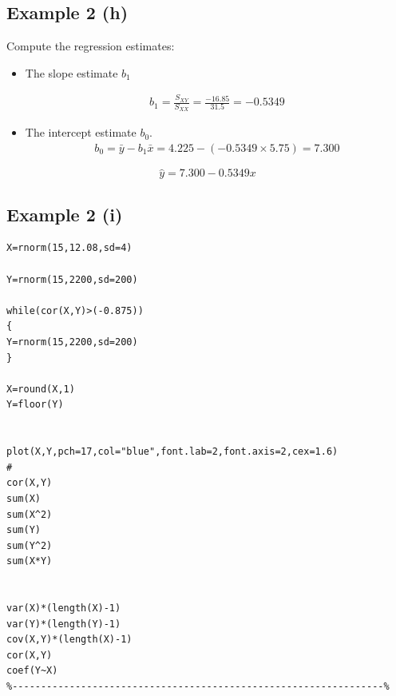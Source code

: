 \documentclass[]{report}
\begin{document}
\subsection{Example 2 (h)}
Compute the regression estimates:
\begin{itemize}
	\item  The slope estimate $b_1$
	
	\begin{eqnarray*}
		b_1 = \frac{S_{XY}}{S_{XX}} = \frac{-16.85}{31.5} = -0.5349
	\end{eqnarray*}
	
	\item  The intercept estimate $b_0$.
	\begin{eqnarray*}
		b_0 = \bar{y} -b_1\bar{x} = 4.225 - (-0.5349 \times 5.75) = 7.300
	\end{eqnarray*}
\end{itemize}

\[ \hat{y}  = 7.300 -0.5349 x \]




\subsection{Example 2 (i)}

%
%


\begin{verbatim}
X=rnorm(15,12.08,sd=4)

Y=rnorm(15,2200,sd=200)

while(cor(X,Y)>(-0.875))
{
Y=rnorm(15,2200,sd=200)
}

X=round(X,1)
Y=floor(Y)


plot(X,Y,pch=17,col="blue",font.lab=2,font.axis=2,cex=1.6)
#
cor(X,Y)
sum(X)
sum(X^2)
sum(Y)
sum(Y^2)
sum(X*Y)


var(X)*(length(X)-1)
var(Y)*(length(Y)-1)
cov(X,Y)*(length(X)-1)
cor(X,Y)
coef(Y~X)
%-----------------------------------------------------------------% 

\end{verbatim}
\end{document}
